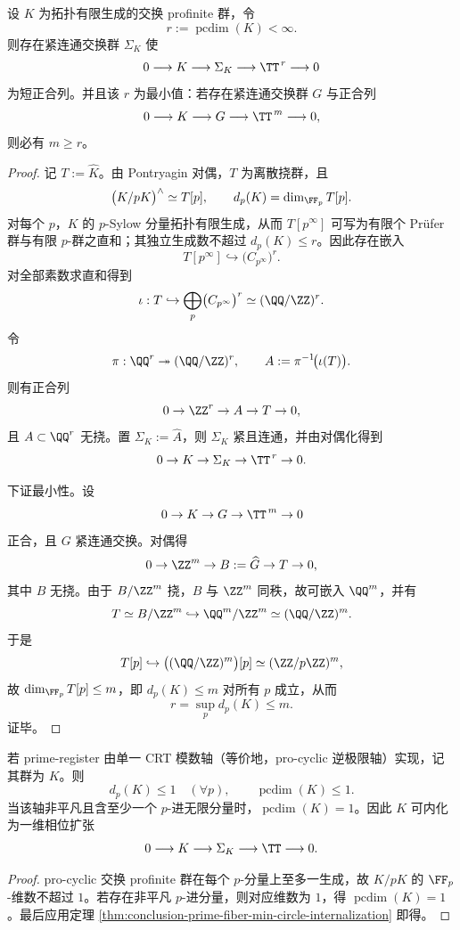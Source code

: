 \begin{theorem}[素数纤维的最小圆维内化原理]\label{thm:conclusion-prime-fiber-min-circle-internalization}
设 \(K\) 为拓扑有限生成的交换 profinite 群，令
\[
r:=\operatorname{pcdim}(K)<\infty.
\]
则存在紧连通交换群 \(\Sigma_K\) 使
\[
0\longrightarrow K\longrightarrow \Sigma_K\longrightarrow \TT^{\,r}\longrightarrow 0
\]
为短正合列。并且该 \(r\) 为最小值：若存在紧连通交换群 \(G\) 与正合列
\[
0\longrightarrow K\longrightarrow G\longrightarrow \TT^{\,m}\longrightarrow 0,
\]
则必有 \(m\ge r\)。
\end{theorem}
\begin{proof}
记 \(T:=\widehat K\)。由 Pontryagin 对偶，\(T\) 为离散挠群，且
\[
\bigl(K/pK\bigr)^\wedge\simeq T[p],\qquad
d_p(K)=\dim_{\FF_p}T[p].
\]
对每个 \(p\)，\(K\) 的 \(p\)-Sylow 分量拓扑有限生成，从而 \(T[p^\infty]\) 可写为有限个 Prüfer 群与有限 \(p\)-群之直和；其独立生成数不超过 \(d_p(K)\le r\)。因此存在嵌入
\[
T[p^\infty]\hookrightarrow \bigl(C_{p^\infty}\bigr)^r.
\]
对全部素数求直和得到
\[
\iota:T\hookrightarrow \bigoplus_{p}\bigl(C_{p^\infty}\bigr)^r
\simeq (\QQ/\ZZ)^r.
\]
令
\[
\pi:\QQ^r\twoheadrightarrow (\QQ/\ZZ)^r,\qquad
A:=\pi^{-1}\!\bigl(\iota(T)\bigr).
\]
则有正合列
\[
0\to \ZZ^r\to A\to T\to 0,
\]
且 \(A\subset \QQ^r\) 无挠。置 \(\Sigma_K:=\widehat A\)，则 \(\Sigma_K\) 紧且连通，并由对偶化得到
\[
0\to K\to \Sigma_K\to \TT^{\,r}\to 0.
\]

下证最小性。设
\[
0\to K\to G\to \TT^{\,m}\to 0
\]
正合，且 \(G\) 紧连通交换。对偶得
\[
0\to \ZZ^m\to B:=\widehat G\to T\to 0,
\]
其中 \(B\) 无挠。由于 \(B/\ZZ^m\) 挠，\(B\) 与 \(\ZZ^m\) 同秩，故可嵌入 \(\QQ^m\)，并有
\[
T\simeq B/\ZZ^m\hookrightarrow \QQ^m/\ZZ^m\simeq (\QQ/\ZZ)^m.
\]
于是
\[
T[p]\hookrightarrow \bigl((\QQ/\ZZ)^m\bigr)[p]\simeq (\ZZ/p\ZZ)^m,
\]
故 \(\dim_{\FF_p}T[p]\le m\)，即 \(d_p(K)\le m\) 对所有 \(p\) 成立，从而
\[
r=\sup_p d_p(K)\le m.
\]
证毕。
\end{proof}

\begin{corollary}\label{cor:conclusion-crt-prime-register-one-circle}
若 prime-register 由单一 CRT 模数轴（等价地，pro-cyclic 逆极限轴）实现，记其群为 \(K\)。则
\[
d_p(K)\le 1\quad(\forall p),
\qquad
\operatorname{pcdim}(K)\le 1.
\]
当该轴非平凡且含至少一个 \(p\)-进无限分量时，\(\operatorname{pcdim}(K)=1\)。因此 \(K\) 可内化为一维相位扩张
\[
0\longrightarrow K\longrightarrow \Sigma_K\longrightarrow \TT\longrightarrow 0.
\]
\end{corollary}
\begin{proof}
pro-cyclic 交换 profinite 群在每个 \(p\)-分量上至多一生成，故 \(K/pK\) 的 \(\FF_p\)-维数不超过 \(1\)。若存在非平凡 \(p\)-进分量，则对应维数为 \(1\)，得 \(\operatorname{pcdim}(K)=1\)。最后应用定理 \ref{thm:conclusion-prime-fiber-min-circle-internalization} 即得。
\end{proof}

